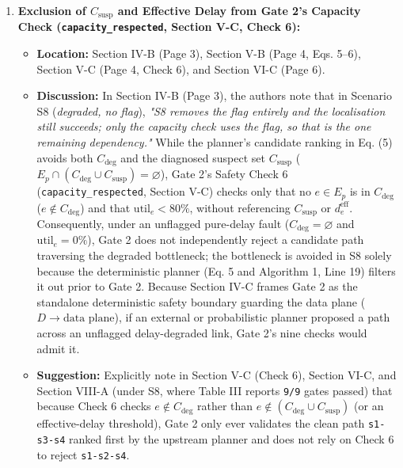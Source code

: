 \documentclass[11pt,a4paper]{article}
\begin{document}
\begin{enumerate}[leftmargin=1.6em,itemsep=3pt]
\item \textbf{Exclusion of $C_{\text{susp}}$ and Effective Delay from Gate 2's Capacity Check (\texttt{capacity\_respected}, Section V-C, Check 6):}
\begin{itemize}[leftmargin=1.8em,itemsep=2pt]
\item \textbf{Location:} Section IV-B (Page 3), Section V-B (Page 4, Eqs. 5–6), Section V-C (Page 4, Check 6), and Section VI-C (Page 6).
\item \textbf{Discussion:} In Section IV-B (Page 3), the authors note that in Scenario S8 (\emph{degraded, no flag}), \emph{"S8 removes the flag entirely and the localisation still succeeds; only the capacity check uses the flag, so that is the one remaining dependency."} While the planner's candidate ranking in Eq. (5) avoids both $C_{\text{deg}}$ and the diagnosed suspect set $C_{\text{susp}}$ ($E_p \cap (C_{\text{deg}} \cup C_{\text{susp}}) = \varnothing$), Gate 2's Safety Check 6 (\texttt{capacity\_respected}, Section V-C) checks only that no $e \in E_p$ is in $C_{\text{deg}}$ ($e \notin C_{\text{deg}}$) and that $\text{util}_e < 80\%$, without referencing $C_{\text{susp}}$ or $d_e^{\text{eff}}$. Consequently, under an unflagged pure-delay fault ($C_{\text{deg}} = \varnothing$ and $\text{util}_e = 0\%$), Gate 2 does not independently reject a candidate path traversing the degraded bottleneck; the bottleneck is avoided in S8 solely because the deterministic planner (Eq. 5 and Algorithm 1, Line 19) filters it out prior to Gate 2. Because Section IV-C frames Gate 2 as the standalone deterministic safety boundary guarding the data plane ($D \to \text{data plane}$), if an external or probabilistic planner proposed a path across an unflagged delay-degraded link, Gate 2's nine checks would admit it.
\item \textbf{Suggestion:} Explicitly note in Section V-C (Check 6), Section VI-C, and Section VIII-A (under S8, where Table III reports \texttt{9/9} gates passed) that because Check 6 checks $e \notin C_{\text{deg}}$ rather than $e \notin (C_{\text{deg}} \cup C_{\text{susp}})$ (or an effective-delay threshold), Gate 2 only ever validates the clean path \texttt{s1-s3-s4} ranked first by the upstream planner and does not rely on Check 6 to reject \texttt{s1-s2-s4}.
\end{itemize}
\end{enumerate}
\end{document}
